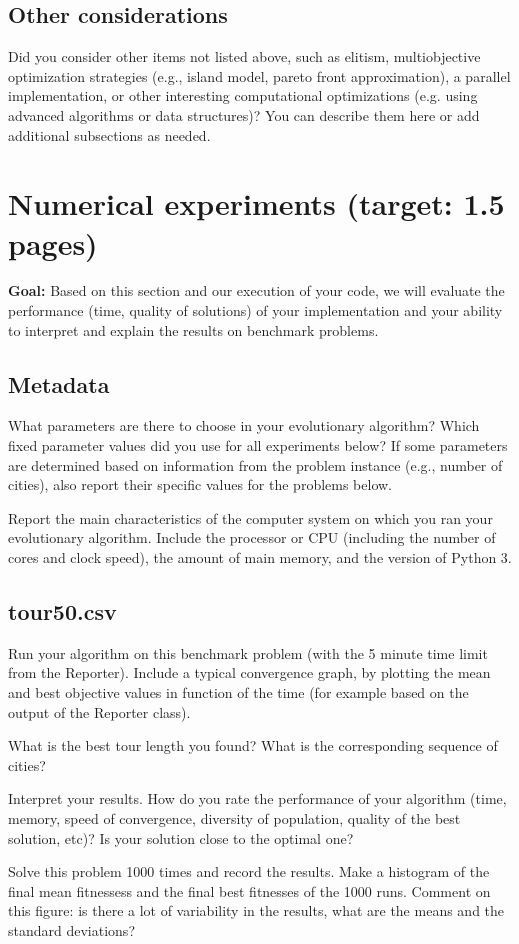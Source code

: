 \documentclass[a4paper,10pt]{article}
\newcommand{\ReplaceMe}[1]{{\color{blue}#1}}
\newcommand{\RemoveMe}[1]{{\color{purple}#1}}
\begin{document}
\subsection{Other considerations}

\ReplaceMe{Did you consider other items not listed above, such as elitism, multiobjective optimization strategies (e.g., island model, pareto front approximation), a parallel implementation, or other interesting computational optimizations (e.g. using advanced algorithms or data structures)? You can describe them here or add additional subsections as needed.}


\section{Numerical experiments (target: 1.5 pages)}

\RemoveMe{\textbf{Goal:} Based on this section and our execution of your code, we will evaluate the performance (time, quality of solutions) of your implementation and your ability to interpret and explain the results on benchmark problems.}

\subsection{Metadata}

\ReplaceMe{What parameters are there to choose in your evolutionary algorithm? Which fixed parameter values did you use for all experiments below? If some parameters are determined based on information from the problem instance (e.g., number of cities), also report their specific values for the problems below.

Report the main characteristics of the computer system on which you ran your evolutionary algorithm. Include the processor or CPU (including the number of cores and clock speed), the amount of main memory, and the version of Python 3.}


\subsection{tour50.csv}

\ReplaceMe{Run your algorithm on this benchmark problem (with the 5 minute time limit from the Reporter). Include a typical convergence graph, by plotting the mean and best objective values in function of the time (for example based on the output of the Reporter class). 

What is the best tour length you found? What is the corresponding sequence of cities? 

Interpret your results. How do you rate the performance of your algorithm (time, memory, speed of convergence, diversity of population, quality of the best solution, etc)? Is your solution close to the optimal one?

Solve this problem 1000 times and record the results. Make a histogram of the final mean fitnessess and the final best fitnesses of the 1000 runs. Comment on this figure: is there a lot of variability in the results, what are the means and the standard deviations?}
\end{document}

